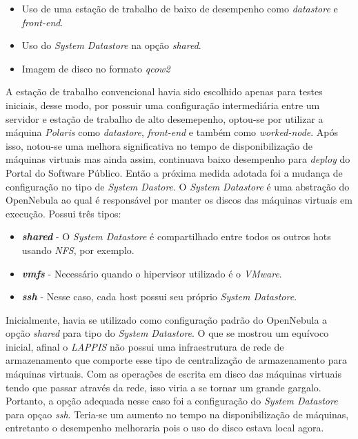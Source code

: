 \begin{itemize}
\item Uso de uma estação de trabalho de baixo de desempenho como \textit{datastore} e \textit{front-end}.
\item Uso do \textit{System Datastore} na opção \textit{shared}.
\item Imagem de disco no formato \textit{qcow2}
\end{itemize}

A estação de trabalho convencional havia sido escolhido apenas para testes iniciais, desse modo, por possuir uma configuração intermediária entre um servidor e estação de trabalho de alto desemepenho, optou-se por utilizar a máquina \textit{Polaris} como \textit{datastore}, \textit{front-end} e também como \textit{worked-node}. Após isso, notou-se uma melhora significativa no tempo de disponibilização de máquinas virtuais mas ainda assim, continuava baixo desempenho para \textit{deploy} do Portal do Software Público. Então a próxima medida adotada foi a mudança de configuração no tipo de \textit{System Dastore}. O \textit{System Datastore} é uma abstração do OpenNebula ao qual é responsável por manter os discos das máquinas virtuais em execução. Possui três tipos:

\begin{itemize}
\item \textit{\textbf{shared}} - O \textit{System Datastore} é compartilhado entre todos os outros hots usando \textit{NFS}, por exemplo.
\item \textit{\textbf{vmfs}} - Necessário quando o hipervisor utilizado é o \textit{VMware}.
\item \textit{\textbf{ssh}} - Nesse caso, cada host possui seu próprio \textit{System Datastore}.
\end{itemize}

Inicialmente, havia se utilizado como configuração padrão do OpenNebula a opção \textit{shared} para tipo do \textit{System Datastore}. O que se mostrou um equívoco inicial, afinal o \textit{LAPPIS} não possui uma infraestrutura de rede de armazenamento que comporte esse tipo de centralização de armazenamento para máquinas virtuais. Com as operações de escrita em disco das máquinas virtuais tendo que passar através da rede, isso viria a se tornar um grande gargalo. Portanto, a opção adequada nesse caso foi a configuração do \textit{System Datastore} para opçao \textit{ssh}. Teria-se um aumento no tempo na disponibilização de máquinas, entretanto o desempenho melhoraria pois o uso do disco estava local agora. 

